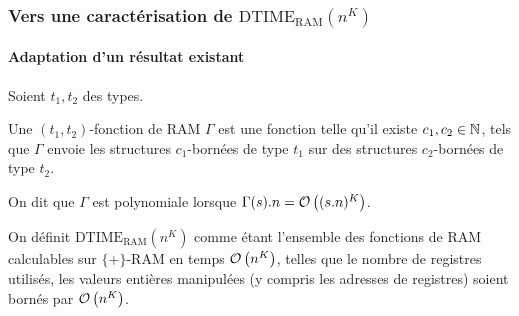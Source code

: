\documentclass[10pt]{beamer}
\newcommand{\dtimeram}{\text{DTIME}_{\text{RAM}}\left( n^K \right)}
\begin{document}
	
	
	\begin{frame}
		\frametitle{Vers une caractérisation de $\dtimeram$}
		\framesubtitle{Adaptation d'un résultat existant}
		

			\begin{defn}
				Soient $t_1, t_2$ des types. 
				
				Une $(t_1, t_2)$-fonction de RAM $\Gamma$ est une fonction telle qu'il existe $c_1, c_2 \in \mathbb{N}$, tels que $\Gamma$ envoie les structures $c_1$-bornées de type $t_1$ sur des structures $c_2$-bornées de type $t_2$.
				
				On dit que $\Gamma$ est polynomiale lorsque $\Gamma(s).n = \mathcal{O}\left( (s.n)^K \right)$.
				
			\end{defn}
			
		\pause 
		\begin{defn}
			\label{def:temps_poly_RAM}
			On définit $\dtimeram$ comme étant l'ensemble des fonctions de RAM calculables sur $\{+\}$-RAM en temps $\mathcal{O}\left( n^K \right)$, telles que le nombre de registres utilisés, les valeurs entières manipulées (y compris les adresses de registres) soient bornés par $\mathcal{O}\left( n^K \right)$.
		\end{defn}

	\end{frame}
	
	
	
%		
%			
%				
%				
%			
\end{document}
